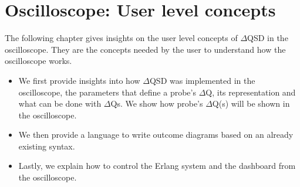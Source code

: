 \chapter{Oscilloscope: User level concepts}
    The following chapter gives insights on the user level concepts of $\Delta$QSD in the oscilloscope. They are the concepts needed by the user to understand how the oscilloscope works.
    \begin{itemize}
        \item We first provide insights into how $\Delta$QSD was implemented in the oscilloscope, the parameters that define a probe's $\Delta$Q, its representation and what can be done with $\Delta$Qs. We show how probe's $\Delta$Q(s) will be shown in the oscilloscope.
        \item We then provide a language to write outcome diagrams based on an already existing syntax.
        \item Lastly, we explain how to control the Erlang system and the dashboard from the oscilloscope.
    \end{itemize}








